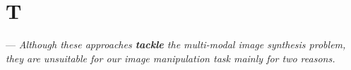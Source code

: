 \section{T}

 --- \textit{Although these approaches \textbf{tackle} the multi-modal image synthesis problem, they are unsuitable for our image manipulation task mainly for two reasons.}
